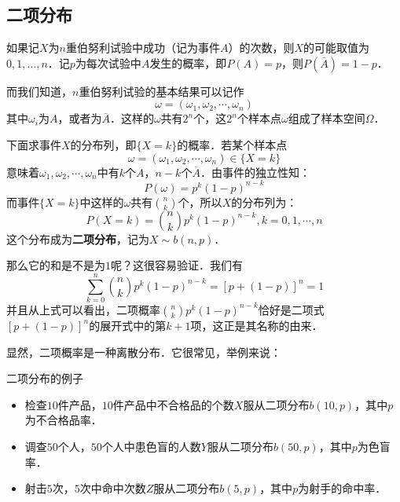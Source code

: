 
\subsection{二项分布}
如果记$X $为$n $重伯努利试验中成功（记为事件$A$）的次数，则$X $的可能取值为$0,1,\dots,n$．记$p $为每次试验中$A $发生的概率，即$P(A)=p$，则$P(\overline{A})=1-p$．

而我们知道，$n$重伯努利试验的基本结果可以记作
\begin{equation}
\omega=\left(\omega_{1}, \omega_{2}, \cdots, \omega_{n}\right)
\end{equation}
其中$\omega_i$为$A$，或者为$\overline{A}$．这样的$\omega$共有$2^n$个，这$2^n$个样本点$\omega$组成了样本空间$\Omega$．

下面求事件$X$的分布列，即$\{X=k\}$的概率．若某个样本点
\begin{equation}
\omega=\left(\omega_{1}, \omega_{2}, \cdots, \omega_{n}\right) \in\{X=k\}
\end{equation}
意味着$\omega_1,\omega_2,\cdots,\omega_n$中有$k$个$A$，$n-k$个$\overline A$．由事件的独立性知：
\begin{equation}
P(\omega)=p^{k}(1-p)^{n-k}
\end{equation}
而事件$\{X=k\}$中这样的$\omega$共有$\binom nk$个，所以$X$的分布列为：
\begin{equation}
P(X=k)=\binom nk p^{k}(1-p)^{n-k}, k=0,1, \cdots, n
\end{equation}
这个分布成为\textbf{二项分布}，记为$X\sim b(n, p)$．

那么它的和是不是为$1$呢？这很容易验证．我们有
\begin{equation}
\sum_{k=0}^{n}\binom nk p^{k}(1-p)^{n-k}=[p+(1-p)]^{n}=1
\end{equation}
并且从上式可以看出，二项概率$\binom nk p^{k}(1-p)^{n-k}$恰好是二项式$[p+(1-p)]^{n}$的展开式中的第$k+1$项，这正是其名称的由来．

显然，二项概率是一种离散分布．它很常见，举例来说：
\begin{example}{二项分布的例子}
\begin{itemize}
\item 检查$10$件产品，$ 10 $件产品中不合格品的个数$X $服从二项分布$b(10,p)$，其中$p$为不合格品率．
\item 调查$50 $个人，$ 50 $个人中患色盲的人数$Y $服从二项分布$b(50,p)$，其中$p$为色盲率．
\item 射击$5 $次，$ 5 $次中命中次数$Z $服从二项分布$b(5,p)$，其中$p $为射手的命中率．
\end{itemize}
\end{example}

